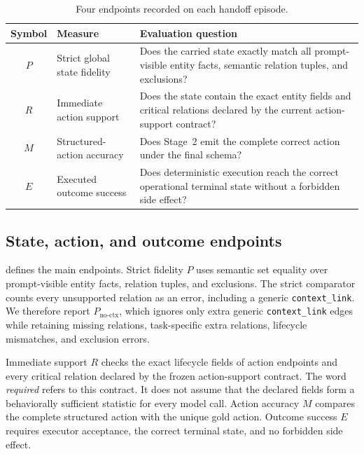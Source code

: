 \documentclass[11pt]{article}
\newcommand{\Rsupport}{R}
\newcommand{\Pstrict}{P}
\newcommand{\Pnoctx}{P_{\mathrm{no\mbox{-}ctx}}}
\newcommand{\Maction}{M}
\newcommand{\Eoutcome}{E}
\begin{document}
\begin{table}[t]
\centering
\caption{Four endpoints recorded on each handoff episode.}
\label{tab:endpoints}
\small
\begin{tabularx}{\linewidth}{@{}c l Y@{}}
\toprule
Symbol & Measure & Evaluation question \\
\midrule
\(\Pstrict\) & Strict global state fidelity & Does the carried state exactly match all prompt-visible entity facts, semantic relation tuples, and exclusions? \\
\(\Rsupport\) & Immediate action support & Does the state contain the exact entity fields and critical relations declared by the current action-support contract? \\
\(\Maction\) & Structured-action accuracy & Does Stage~2 emit the complete correct action under the final schema? \\
\(\Eoutcome\) & Executed outcome success & Does deterministic execution reach the correct operational terminal state without a forbidden side effect? \\
\bottomrule
\end{tabularx}
\end{table}

\subsection{State, action, and outcome endpoints}

 defines the main endpoints. Strict fidelity \(\Pstrict\) uses semantic set equality over prompt-visible entity facts, relation tuples, and exclusions. The strict comparator counts every unsupported relation as an error, including a generic \texttt{context\_link}. We therefore report \(\Pnoctx\), which ignores only extra generic \texttt{context\_link} edges while retaining missing relations, task-specific extra relations, lifecycle mismatches, and exclusion errors.

Immediate support \(\Rsupport\) checks the exact lifecycle fields of action endpoints and every critical relation declared by the frozen action-support contract. The word \emph{required} refers to this contract. It does not assume that the declared fields form a behaviorally sufficient statistic for every model call. Action accuracy \(\Maction\) compares the complete structured action with the unique gold action. Outcome success \(\Eoutcome\) requires executor acceptance, the correct terminal state, and no forbidden side effect.
\end{document}
